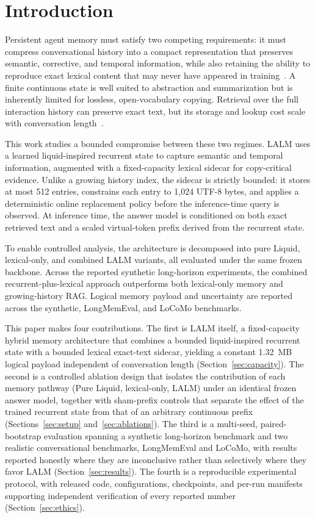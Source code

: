 \documentclass[conference]{IEEEtran}
\begin{document}
\section{Introduction}
\label{sec:intro}
Persistent agent memory must satisfy two competing requirements: it must compress conversational history into a compact representation that preserves semantic, corrective, and temporal information, while also retaining the ability to reproduce exact lexical content that may never have appeared in training~\cite{zhang2024memory}. A finite continuous state is well suited to abstraction and summarization but is inherently limited for lossless, open-vocabulary copying. Retrieval over the full interaction history can preserve exact text, but its storage and lookup cost scale with conversation length~\cite{lewis2020rag}.

This work studies a bounded compromise between these two regimes. LALM uses a learned liquid-inspired recurrent state to capture semantic and temporal information, augmented with a fixed-capacity lexical sidecar for copy-critical evidence. Unlike a growing history index, the sidecar is strictly bounded: it stores at most 512 entries, constrains each entry to 1,024 UTF-8 bytes, and applies a deterministic online replacement policy before the inference-time query is observed. At inference time, the answer model is conditioned on both exact retrieved text and a scaled virtual-token prefix derived from the recurrent state.

To enable controlled analysis, the architecture is decomposed into pure Liquid, lexical-only, and combined LALM variants, all evaluated under the same frozen backbone. Across the reported synthetic long-horizon experiments, the combined recurrent-plus-lexical approach outperforms both lexical-only memory and growing-history RAG. Logical memory payload and uncertainty are reported across the synthetic, LongMemEval, and LoCoMo benchmarks.

This paper makes four contributions. The first is LALM itself, a fixed-capacity hybrid memory architecture that combines a bounded liquid-inspired recurrent state with a bounded lexical exact-text sidecar, yielding a constant 1.32~MB logical payload independent of conversation length (Section~\ref{sec:capacity}). The second is a controlled ablation design that isolates the contribution of each memory pathway (Pure Liquid, lexical-only, LALM) under an identical frozen answer model, together with sham-prefix controls that separate the effect of the trained recurrent state from that of an arbitrary continuous prefix (Sections~\ref{sec:setup} and~\ref{sec:ablations}). The third is a multi-seed, paired-bootstrap evaluation spanning a synthetic long-horizon benchmark and two realistic conversational benchmarks, LongMemEval and LoCoMo, with results reported honestly where they are inconclusive rather than selectively where they favor LALM (Section~\ref{sec:results}). The fourth is a reproducible experimental protocol, with released code, configurations, checkpoints, and per-run manifests supporting independent verification of every reported number (Section~\ref{sec:ethics}).
\end{document}
